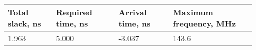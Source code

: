 \begin{table}[]
\begin{center}
\begin{tabular}{|l|l|l|l|}
\hline
Total slack, ns & Required time, ns & Arrival time, ns & Maximum frequency, MHz \\ \hline
1.963           & 5.000             & -3.037           & 143.6                  \\ \hline
\end{tabular}
\end{center}
\end{table}


